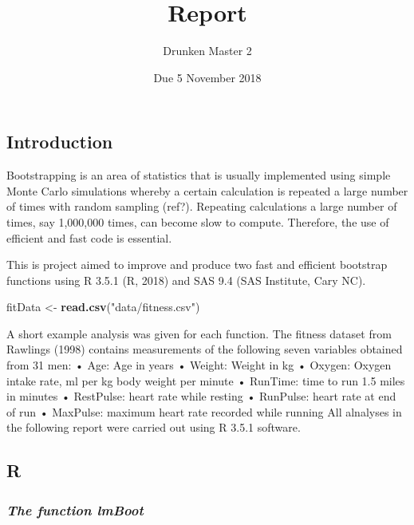 \documentclass[]{article}
\title{Report}
\author{Drunken Master 2}
\date{Due 5 November 2018}
\newenvironment{Shaded}{\begin{snugshade}}{\end{snugshade}}
\newcommand{\KeywordTok}[1]{\textcolor[rgb]{0.13,0.29,0.53}{\textbf{#1}}}
\newcommand{\StringTok}[1]{\textcolor[rgb]{0.31,0.60,0.02}{#1}}
\newcommand{\NormalTok}[1]{#1}
\begin{document}
\maketitle

{
\setcounter{tocdepth}{3}
\tableofcontents
}
\subsection{Introduction}\label{introduction}

Bootstrapping is an area of statistics that is usually implemented using
simple Monte Carlo simulations whereby a certain calculation is repeated
a large number of times with random sampling (ref?). Repeating
calculations a large number of times, say 1,000,000 times, can become
slow to compute. Therefore, the use of efficient and fast code is
essential.

This is project aimed to improve and produce two fast and efficient
bootstrap functions using R 3.5.1 (R, 2018) and SAS 9.4 (SAS Institute,
Cary NC).

\begin{Shaded}
\begin{Highlighting}[]
\NormalTok{fitData <-}\StringTok{ }\KeywordTok{read.csv}\NormalTok{(}\StringTok{"data/fitness.csv"}\NormalTok{)}
\end{Highlighting}
\end{Shaded}

A short example analysis was given for each function. The fitness
dataset from Rawlings (1998) contains measurements of the following
seven variables obtained from 31 men: • Age: Age in years • Weight:
Weight in kg • Oxygen: Oxygen intake rate, ml per kg body weight per
minute • RunTime: time to run 1.5 miles in minutes • RestPulse: heart
rate while resting • RunPulse: heart rate at end of run • MaxPulse:
maximum heart rate recorded while running All alnalyses in the following
report were carried out using R 3.5.1 software.

\pagebreak

\subsection{R}\label{r}

\subsubsection{\texorpdfstring{\emph{The function
lmBoot}}{The function lmBoot}}\label{the-function-lmboot}
\end{document}
